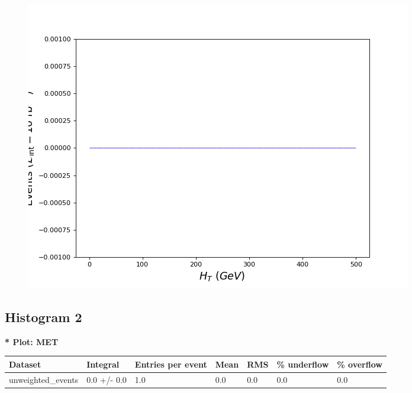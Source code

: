 \documentclass[a4paper, 10pt]{article}
\begin{document}
\begin{figure}[H]
  \begin{center}
    \includegraphics[scale=0.45]{selection_0.png}\\
\caption{   }
  \end{center}
\end{figure}
      \newpage
\subsection{ Histogram 2}

\textbf{* Plot: MET}\\
   \begin{table}[H]
  \begin{center}
    \begin{tabular}{|m{23.0mm}|m{23.0mm}|m{18.0mm}|m{19.0mm}|m{19.0mm}|m{19.0mm}|m{19.0mm}|}
      \hline
      {\cellcolor{yellow}         Dataset}& {\cellcolor{yellow}         Integral}& {\cellcolor{yellow}         Entries per event}& {\cellcolor{yellow}         Mean}& {\cellcolor{yellow}         RMS}& {\cellcolor{yellow}         \% underflow}& {\cellcolor{yellow}         \% overflow}\\
      \hline
      {\cellcolor{white}         unweighted\_events}& {\cellcolor{white}         0.0 +/\-- 0.0}& {\cellcolor{white}         1.0}& {\cellcolor{white}         0.0}& {\cellcolor{white}         0.0}& {\cellcolor{green}         0.0}& {\cellcolor{green}         0.0}\\
\hline
    \end{tabular}
  \end{center}
\end{table}
\end{document}
